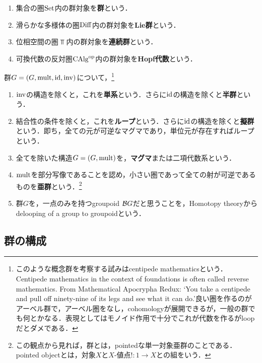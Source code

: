 \documentclass[uplatex,dvipdfmx]{jsreport}
\begin{document}
\begin{definition}\mbox{}
    \begin{enumerate}
        \item 集合の圏$\mathrm{Set}$内の群対象を\textbf{群}という．
        \item 滑らかな多様体の圏$\mathrm{Diff}$内の群対象を\textbf{Lie群}という．
        \item 位相空間の圏$\Top$内の群対象を\textbf{連続群}という．
        \item 可換代数の反対圏$\mathrm{CAlg}^{\mathrm{op}}$内の群対象を\textbf{Hopf代数}という．
    \end{enumerate}
\end{definition}

\begin{definition}
    群$G=(G,\mathrm{mult},\mathrm{id},\mathrm{inv})$について，\footnote{このような概念群を考察する試みはcentipede mathematicsという．Centipede mathematics in the context of foundations is often called reverse mathematics. From Mathematical Apocrypha Redux: ‘You take a centipede and pull off ninety-nine of its legs and see what it can do.’良い圏を作るのがアーベル群で，アーベル圏をなし，cohomologyが展開できるが，一般の群でも何とかなる．表現としてはモノイド作用で十分でこれが代数を作るがloopだとダメである．}
    \begin{enumerate}
        \item $\mathrm{inv}$の構造を除くと，これを\textbf{単系}という．さらに$\mathrm{id}$の構造を除くと\textbf{半群}という．
        \item 結合性の条件を除くと，これを\textbf{ループ}という．さらに$\mathrm{id}$の構造を除くと\textbf{擬群}という．即ち，全ての元が可逆なマグマであり，単位元が存在すればループという．
        \item 全てを除いた構造$G=(G,\mathrm{mult})$を，\textbf{マグマ}または二項代数系という．
        \item $\mathrm{mult}$を部分写像であることを認め，小さい圏であって全ての射が可逆であるものを\textbf{亜群}という．\footnote{この観点から見れば，群とは，pointedな単一対象亜群のことである．pointed objectとは，対象$X$と$X$-値点$!:1\to X$との組をいう．}
        \item 群$G$を，一点のみを持つgroupoid $\mathcal{B} G$だと思うことを，Homotopy theoryからdelooping of a group to groupoidという．
    \end{enumerate}
\end{definition}

\subsection{群の構成}
\end{document}
